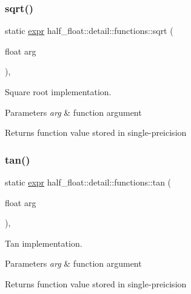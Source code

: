 \subsubsection{\texorpdfstring{sqrt()}{sqrt()}}
{\footnotesize\ttfamily static \hyperlink{structhalf__float_1_1detail_1_1expr}{expr} half\+\_\+float\+::detail\+::functions\+::sqrt (\begin{DoxyParamCaption}\item[{float}]{arg }\end{DoxyParamCaption})\hspace{0.3cm}{\ttfamily [inline]}, {\ttfamily [static]}}

Square root implementation. 
\begin{DoxyParams}{Parameters}
{\em arg} & function argument \\
\hline
\end{DoxyParams}
\begin{DoxyReturn}{Returns}
function value stored in single-\/preicision 
\end{DoxyReturn}
\mbox{\label{structhalf__float_1_1detail_1_1functions_a420e4d5c94115d9229b726ea76f26cb3}} 
\subsubsection{\texorpdfstring{tan()}{tan()}}
{\footnotesize\ttfamily static \hyperlink{structhalf__float_1_1detail_1_1expr}{expr} half\+\_\+float\+::detail\+::functions\+::tan (\begin{DoxyParamCaption}\item[{float}]{arg }\end{DoxyParamCaption})\hspace{0.3cm}{\ttfamily [inline]}, {\ttfamily [static]}}

Tan implementation. 
\begin{DoxyParams}{Parameters}
{\em arg} & function argument \\
\hline
\end{DoxyParams}
\begin{DoxyReturn}{Returns}
function value stored in single-\/preicision 
\end{DoxyReturn}
\mbox{\label{structhalf__float_1_1detail_1_1functions_a186af458d15802461dfa73b5a8f7e44b}} 
